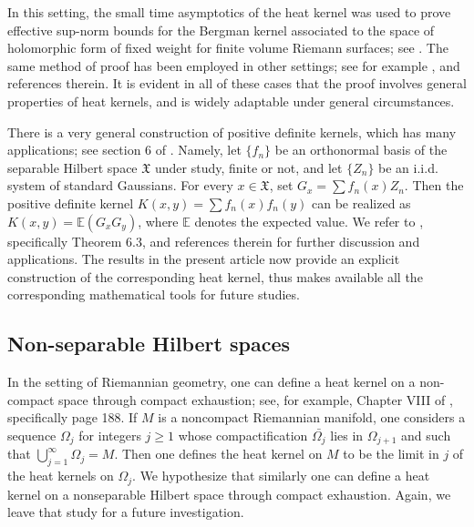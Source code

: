 \documentclass[11pt,reqno]{amsart}
\theoremstyle{remark}
\theoremstyle{definition}
\numberwithin{theorem}{section} \numberwithin{equation}{section}
\newcommand{\X}{\mathfrak{X}}
\begin{document}
In this setting, the small time asymptotics of the heat kernel was used to prove effective sup-norm
bounds for the Bergman kernel associated to the space of holomorphic form of fixed
weight for finite volume Riemann surfaces; see \cite{FJK19}.  The same method of
proof has been employed in other settings; see for example \cite{ABR25}, \cite{AKvP25} and references therein.
It is evident in all of these cases that the proof involves general properties of heat kernels,
and is widely adaptable under general circumstances.

There is a very general construction of positive definite kernels, which has many applications;
see section 6 of \cite{JT21}. Namely,  let $\{f_{n}\}$ be an orthonormal basis of the separable Hilbert space $\X$
under study, finite or not, and let $\{Z_{n}\}$ be an i.i.d. system of standard Gaussians.  For every
$x \in \X$, set $G_x = \sum f_n(x) Z_n$.  Then the positive definite kernel $K(x,y) = \sum f_{n}(x) f_{n}(y)$
can be realized as $K(x,y) = \mathbb{E}(G_x G_y)$, where $\mathbb{E}$ denotes the expected value.
We refer to \cite{JT21}, specifically Theorem 6.3, and references therein for further discussion and
applications.  The results in the present article now provide an explicit construction of the
corresponding heat kernel, thus makes available all the corresponding mathematical tools for future studies.


\subsection{Non-separable Hilbert spaces} In the setting of Riemannian geometry, one can define
a heat kernel on a non-compact space through compact exhaustion; see, for example, Chapter VIII of \cite{Ch84},
specifically page 188.  If $M$ is a noncompact Riemannian manifold, one considers a sequence
$\Omega_{j}$ for integers $j \geq 1$ whose compactification $\bar{\Omega_{j}}$ lies in $\Omega_{j+1}$
and such that $\displaystyle \bigcup\limits_{j=1}^{\infty} \Omega_{j} = M$.  Then one defines the
heat kernel on $M$ to be the limit in $j$ of the heat kernels on $\Omega_{j}$.  We hypothesize that similarly
one can define a heat kernel on a nonseparable Hilbert space through compact exhaustion. Again, we leave that
study for a future investigation.

\end{document}
